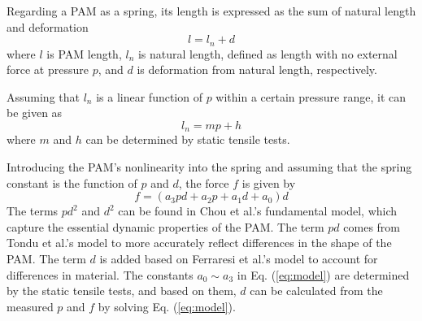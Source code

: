 Regarding a PAM as a spring\cite{spring}, its length is expressed as the sum of natural length and deformation
\begin{equation}
   l = l_n + d
\label{eq:estimation}
\end{equation}
where $l$ is PAM length, $l_n$ is natural length, defined as length with no external force at pressure $p$, and $d$ is deformation from natural length, respectively.
 
Assuming that $l_n$ is a linear function of $p$ within a certain pressure range, it can be given as
\begin{equation}
l_n = mp + h
\label{eq:L_n}
\end{equation}
where $m$ and $h$ can be determined by static tensile tests.
 
Introducing the PAM's nonlinearity into the spring and assuming that the spring constant is the function of $p$ and $d$, the force $f$ is given by
\begin{equation}
\label{eq:model}
f = (a_3pd + a_2p + a_1d + a_0)d
\end{equation}
The terms $pd^2$ and $d^2$ can be found in Chou et al.'s fundamental model\cite{chouMeasurementModelingMcKibben1996}, which capture the essential dynamic properties of the PAM. The term $pd$  comes from Tondu et al.'s model\cite{ModelingControl} to more accurately reflect differences in the shape of the PAM. The term $d$ is added based on Ferraresi et al.'s model\cite{Comparison} to account for differences in material. The constants $a_0 \sim a_3$ in Eq. (\ref{eq:model}) are determined by the static tensile tests, and based on them, $d$  can be calculated from the measured $p$ and $f$ by solving Eq. (\ref{eq:model}).
